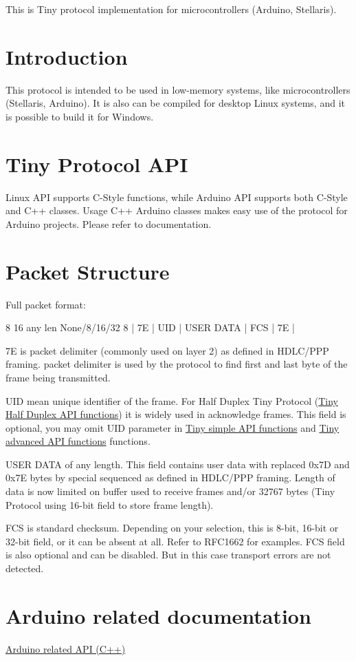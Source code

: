 This is Tiny protocol implementation for microcontrollers (Arduino, Stellaris).\hypertarget{index_introduction}{}\section{Introduction}\label{index_introduction}
This protocol is intended to be used in low-\/memory systems, like microcontrollers (Stellaris, Arduino). It is also can be compiled for desktop Linux systems, and it is possible to build it for Windows.\hypertarget{index_api}{}\section{Tiny Protocol A\+P\+I}\label{index_api}
Linux A\+P\+I supports C-\/\+Style functions, while Arduino A\+P\+I supports both C-\/\+Style and C++ classes. Usage C++ Arduino classes makes easy use of the protocol for Arduino projects. Please refer to documentation.\hypertarget{index_packet}{}\section{Packet Structure}\label{index_packet}
Full packet format\+: 
\begin{DoxyPre}
     8       16       any len    None/8/16/32     8
 |   7E   |  UID  |  USER DATA  |    FCS     |   7E   |
\end{DoxyPre}



\begin{DoxyItemize}
\item 7\+E is packet delimiter (commonly used on layer 2) as defined in H\+D\+L\+C/\+P\+P\+P framing. packet delimiter is used by the protocol to find first and last byte of the frame being transmitted.
\item U\+I\+D mean unique identifier of the frame. For Half Duplex Tiny Protocol (\hyperlink{group__HALF__DUPLEX__API}{Tiny Half Duplex A\+P\+I functions}) it is widely used in acknowledge frames. This field is optional, you may omit U\+I\+D parameter in \hyperlink{group__SIMPLE__API}{Tiny simple A\+P\+I functions} and \hyperlink{group__ADVANCED__API}{Tiny advanced A\+P\+I functions} functions.
\item U\+S\+E\+R D\+A\+T\+A of any length. This field contains user data with replaced 0x7\+D and 0x7\+E bytes by special sequenced as defined in H\+D\+L\+C/\+P\+P\+P framing. Length of data is now limited on buffer used to receive frames and/or 32767 bytes (Tiny Protocol using 16-\/bit field to store frame length).
\item F\+C\+S is standard checksum. Depending on your selection, this is 8-\/bit, 16-\/bit or 32-\/bit field, or it can be absent at all. Refer to R\+F\+C1662 for examples. F\+C\+S field is also optional and can be disabled. But in this case transport errors are not detected.
\end{DoxyItemize}\hypertarget{index_arduino_section}{}\section{Arduino related documentation}\label{index_arduino_section}
\hyperlink{arduino}{Arduino related A\+P\+I (C++)} 
